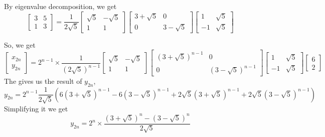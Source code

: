 \begin{solution}
    By eigenvalue decomposition, we get
    \[\begin{bmatrix} 3&5\\1&3 \end{bmatrix}=\frac{1}{2\sqrt{5}}
    \begin{bmatrix}\sqrt{5}&-\sqrt{5} \\1&1\end{bmatrix}\begin{bmatrix}
    3+\sqrt{5}&0\\0&3-\sqrt{5}\end{bmatrix} \begin{bmatrix}
    1 &\sqrt{5} \\-1&\sqrt{5}\end{bmatrix}\] 

    So, we get
    \[\begin{bmatrix} x_{2n}\\y_{2n} \end{bmatrix} = 2^{n-1}\times
    \frac{1}{\left(2\sqrt{5}\right)^{n-1}}
    \begin{bmatrix}\sqrt{5}&-\sqrt{5}\\1&1\end{bmatrix}\begin{bmatrix}
    \left(3+\sqrt{5}\right)^{n-1}&0\\0&\left(3-\sqrt{5}\right)^{n-1}\end{bmatrix}
    \begin{bmatrix} 1&\sqrt{5}\\-1&\sqrt{5}\end{bmatrix} \begin{bmatrix} 6\\2
    \end{bmatrix} \] 
    The gives us the result of $y_{2n}$,
    \[y_{2n} = 2^{n-1}\frac{1}{2\sqrt{5}}
        \left(6\left(3+\sqrt{5}\right)^{n-1} -
            6\left(3-\sqrt{5}\right)^{n-1} + 2\sqrt{5}\left(3+\sqrt{5}\right)^{n-1} +
    2\sqrt{5}\left(3-\sqrt{5}\right)^{n-1}\right)\] 
    Simplifying it we get
    \[y_{2n} = 2^{n} \times
        \frac{\left(3+\sqrt{5}\right)^{n} -
            \left(3-\sqrt{5}\right)^{n}}{2\sqrt{5}}\] 

\end{solution}
